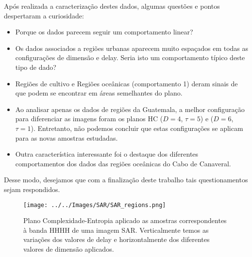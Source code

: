 \documentclass[12pt]{article}
\begin{document}
Após realizada a caracterização destes dados, algumas questões e pontos despertaram a curiosidade:

\begin{itemize}
    \item Porque os dados parecem seguir um comportamento linear?
    \item Os dados associados a regiões urbanas aparecem muito espaçados em todas as configurações de dimensão e delay. Seria isto um comportamento típico deste tipo de dado? 
    \item Regiões de cultivo e Regiões oceânicas (comportamento 1) deram sinais de que podem se encontrar em áreas semelhantes do plano.
    \item Ao analisar apenas os dados de regiões da Guatemala, a melhor configuração para diferenciar as imagens foram os planos HC ($D = 4$, $\tau = 5$) e ($D = 6$, $\tau = 1$). Entretanto, não podemos concluir que estas configurações se aplicam para as novas amostras estudadas.
    \item Outra característica interessante foi o destaque dos diferentes comportamentos dos dados das regiões oceânicas do Cabo de Canaveral. 
\end{itemize}

Desse modo, desejamos que com a finalização deste trabalho tais questionamentos sejam respondidos.

\begin{figure}[!h]
	\centering
	\texttt{[image: ../../Images/SAR/SAR\_regions.png]}        
     \caption{Plano Complexidade-Entropia aplicado as amostras correspondentes à banda HHHH de uma imagem SAR. Verticalmente temos as variações dos valores de delay e horizontalmente dos diferentes valores de dimensão aplicados.}
     \label{fig:Plano}
\end{figure}





\end{document}
